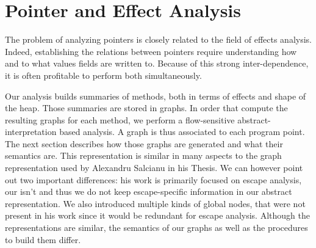 \chapter{Pointer and Effect Analysis}
\label{chap:pointer}
The problem of analyzing pointers is closely related to the field of effects
analysis. Indeed, establishing the relations between pointers require
understanding how and to what values fields are written to. Because of this
strong inter-dependence, it is often profitable to perform both simultaneously.

Our analysis builds summaries of methods, both in terms of effects and shape of
the heap. Those summaries are stored in graphs. In order that compute the
resulting graphs for each method, we perform a flow-sensitive
abstract-interpretation based analysis. A graph is thus associated to each
program point. The next section describes how those graphs are generated and
what their semantics are. This representation is similar in many aspects to
the graph representation used by Alexandru Salcianu in his Thesis. We can %
however point out two important differences: his work is primarily focused on
escape analysis, our isn't and thus we do not keep escape-specific information
in our abstract representation. We also introduced multiple kinds of global
nodes, that were not present in his work since it would be redundant for escape
analysis. Although the representations are similar, the semantics of our graphs
as well as the procedures to build them differ.

